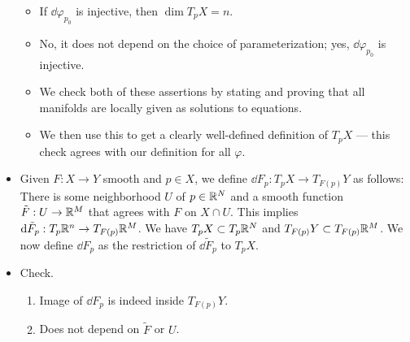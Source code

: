\documentclass[../notes.tex]{subfiles}
\begin{document}
\begin{itemize}
\begin{itemize}
        \item If $\dd{\varphi_{p_0}}$ is injective, then $\dim T_pX=n$.
        \item No, it does not depend on the choice of parameterization; yes, $\dd{\varphi_{p_0}}$ is injective.
        \item We check both of these assertions by stating and proving that all manifolds are locally given as solutions to equations.
        \item We then use this to get a clearly well-defined definition of $T_pX$ --- this check agrees with our definition for all $\varphi$.
    \end{itemize}
    \item Given $F:X\to Y$ smooth and $p\in X$, we define $\dd{F_p}:T_pX\to T_{F(p)}Y$ as follows: There is some neighborhood $U$ of $p\in\mathbb{R}^N$ and a smooth function $\tilde{F}:U\to\mathbb{R}^M$ that agrees with $F$ on $X\cap U$. This implies $\dd{\tilde{F}_p}:T_p\mathbb{R}^n\to T_{F(p)}\mathbb{R}^M$. We have $T_pX\subset T_p\mathbb{R}^N$ and $T_{F(p)}Y\subset T_{F(p)}\mathbb{R}^M$. We now define $\dd{F_p}$ as the restriction of $\dd{\tilde{F}_p}$ to $T_pX$.
    \item Check.
    \begin{enumerate}
        \item Image of $\dd{F_p}$ is indeed inside $T_{F(p)}Y$.
        \item Does not depend on $\tilde{F}$ or $U$.
    \end{enumerate}
\end{itemize}
\end{document}
